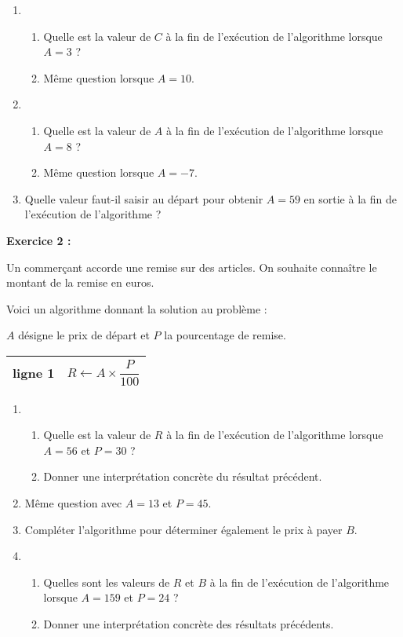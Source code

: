 \begin{enumerate}
\item \begin{enumerate}
      \item Quelle est la valeur de $ C $ à la fin de l'exécution de l'algorithme lorsque $ A = 3 $ ?
      \item Même question lorsque $ A = 10 $.
      \end{enumerate}
\item \begin{enumerate}
      \item Quelle est la valeur de $ A $ à la fin de l'exécution de l'algorithme lorsque $ A = 8 $ ?
      \item Même question lorsque $ A = -7 $.
      \end{enumerate}
\item Quelle valeur faut-il saisir au départ pour obtenir $ A = 59 $ en sortie à la fin de l'exécution de l'algorithme ?
\end{enumerate}

\medskip

\noindent \textbf{Exercice 2 :}

Un commerçant accorde une remise sur des articles. On souhaite connaître le montant de la remise en euros.

Voici un algorithme donnant la solution au problème :

$ A $ désigne le prix de départ et $ P $ la pourcentage de remise.

\medskip

\begin{center}
\renewcommand{\arraystretch}{2.1}
\begin{tabularx}{0.3\linewidth}{|c|X|}
\hline
ligne 1 & $ R \gets A \times \dfrac{P}{100} $  \\
\hline
\end{tabularx}
\end{center}

\begin{enumerate}
\item \begin{enumerate}
      \item Quelle est la valeur de $ R $ à la fin de l'exécution de l'algorithme lorsque $ A = 56 $ et $ P = 30 $ ?
      \item Donner une interprétation concrète du résultat précédent.
      \end{enumerate}
\item Même question avec $ A = 13 $ et $ P = 45 $.
\item Compléter l'algorithme pour déterminer également le prix à payer $ B $.
\item \begin{enumerate}
      \item Quelles sont les valeurs de $ R $ et $ B $ à la fin de l'exécution de l'algorithme lorsque $ A = 159 $ et $ P = 24 $ ?
      \item Donner une interprétation concrète des résultats précédents.
      \end{enumerate}
\end{enumerate}

